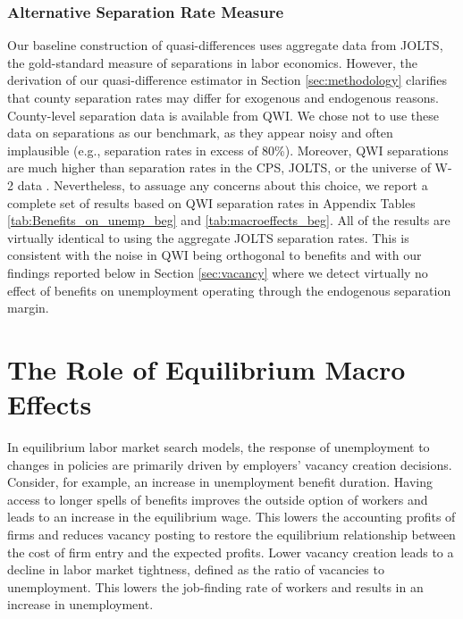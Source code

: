 \documentclass[12pt]{article}
\newcommand{\1}{\mathbf{1}}
\begin{document}
\subsubsection{Alternative Separation Rate Measure}
\label{sec:alt_sep}
Our baseline construction of quasi-differences uses aggregate data from JOLTS, the gold-standard measure of separations in labor economics. However, the derivation of our quasi-difference estimator in Section \ref{sec:methodology} clarifies that county separation rates may differ for exogenous and endogenous reasons. County-level separation data is available from QWI. We chose not to use these data on separations as our benchmark, as they appear noisy and often implausible (e.g., separation rates in excess of 80\%). Moreover, QWI separations are much higher than separation rates in the CPS, JOLTS, or the universe of W-2 data \citep[see, e.g., Figure E2 in][]{hyatt2020business}. Nevertheless, to assuage any concerns about this choice, we report a complete set of results based on QWI separation rates in Appendix Tables \ref{tab:Benefits_on_unemp_beg} and \ref{tab:macroeffects_beg}. All of the results are virtually identical to using the aggregate JOLTS separation rates. This is consistent with the noise in QWI being orthogonal to benefits and with our findings reported below in Section \ref{sec:vacancy} where we detect virtually no effect of benefits on unemployment operating through the endogenous separation margin.

\section{The Role of Equilibrium Macro Effects}
\label{sec:macro_effects}
In equilibrium labor market search models, the response of unemployment to changes in policies are primarily driven by employers' vacancy creation decisions. Consider, for example, an increase in unemployment benefit duration. Having access to longer spells of benefits improves the outside option of workers and leads to an increase in the equilibrium wage. This lowers the accounting profits of firms and reduces vacancy posting to restore the equilibrium relationship between the cost of firm entry and the expected profits. Lower vacancy creation leads to a decline in labor market tightness, defined as the ratio of vacancies to unemployment. This lowers the job-finding rate of workers and results in an increase in unemployment. %
\end{document}
